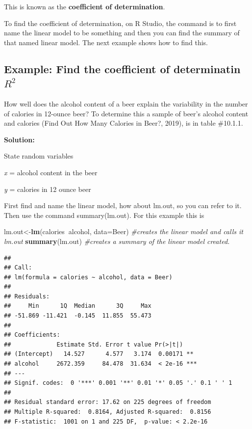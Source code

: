 \documentclass[]{book}
\newenvironment{Shaded}{\begin{snugshade}}{\end{snugshade}}
\newcommand{\CommentTok}[1]{\textcolor[rgb]{0.56,0.35,0.01}{\textit{#1}}}
\newcommand{\DataTypeTok}[1]{\textcolor[rgb]{0.13,0.29,0.53}{#1}}
\newcommand{\KeywordTok}[1]{\textcolor[rgb]{0.13,0.29,0.53}{\textbf{#1}}}
\newcommand{\NormalTok}[1]{#1}
\newcommand{\OperatorTok}[1]{\textcolor[rgb]{0.81,0.36,0.00}{\textbf{#1}}}
\begin{document}
This is known as the \textbf{coefficient of determination}.

To find the coefficient of determination, on R Studio, the command is to first name the linear model to be something and then you can find the summary of that named linear model. The next example shows how to find this.

\hypertarget{example-find-the-coefficient-of-determinatin-r2}{%
\subsection{\texorpdfstring{Example: Find the coefficient of determinatin \(R^2\)}{Example: Find the coefficient of determinatin R\^{}2}}\label{example-find-the-coefficient-of-determinatin-r2}}

How well does the alcohol content of a beer explain the variability in the number of calories in 12-ounce beer? To determine this a sample of beer's alcohol content and calories (Find Out How Many Calories in Beer?, 2019), is in table \#10.1.1.

\textbf{Solution:}

State random variables

\emph{x} = alcohol content in the beer

\emph{y} = calories in 12 ounce beer

First find and name the linear model, how about lm.out, so you can refer to it. Then use the command summary(lm.out). For this example this is

\begin{Shaded}
\begin{Highlighting}[]
\NormalTok{lm.out<-}\KeywordTok{lm}\NormalTok{(calories}\OperatorTok{~}\NormalTok{alcohol, }\DataTypeTok{data=}\NormalTok{Beer) }\CommentTok{#creates the linear model and calls it lm.out}
\KeywordTok{summary}\NormalTok{(lm.out) }\CommentTok{#creates a summary of the linear model created.}
\end{Highlighting}
\end{Shaded}

\begin{verbatim}
## 
## Call:
## lm(formula = calories ~ alcohol, data = Beer)
## 
## Residuals:
##     Min      1Q  Median      3Q     Max 
## -51.869 -11.421  -0.145  11.855  55.473 
## 
## Coefficients:
##             Estimate Std. Error t value Pr(>|t|)    
## (Intercept)   14.527      4.577   3.174  0.00171 ** 
## alcohol     2672.359     84.478  31.634  < 2e-16 ***
## ---
## Signif. codes:  0 '***' 0.001 '**' 0.01 '*' 0.05 '.' 0.1 ' ' 1
## 
## Residual standard error: 17.62 on 225 degrees of freedom
## Multiple R-squared:  0.8164, Adjusted R-squared:  0.8156 
## F-statistic:  1001 on 1 and 225 DF,  p-value: < 2.2e-16
\end{verbatim}
\end{document}

